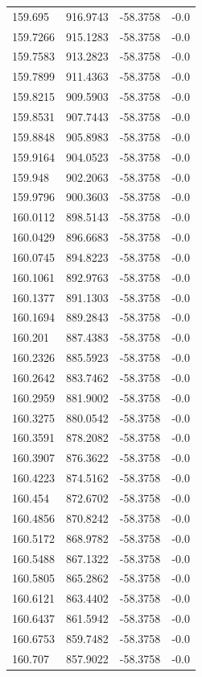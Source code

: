 \begin{table}[H]
\begin{tabular}{llll}
159.695 & 916.9743 & -58.3758 & -0.0 \\
159.7266 & 915.1283 & -58.3758 & -0.0 \\
159.7583 & 913.2823 & -58.3758 & -0.0 \\
159.7899 & 911.4363 & -58.3758 & -0.0 \\
159.8215 & 909.5903 & -58.3758 & -0.0 \\
159.8531 & 907.7443 & -58.3758 & -0.0 \\
159.8848 & 905.8983 & -58.3758 & -0.0 \\
159.9164 & 904.0523 & -58.3758 & -0.0 \\
159.948 & 902.2063 & -58.3758 & -0.0 \\
159.9796 & 900.3603 & -58.3758 & -0.0 \\
160.0112 & 898.5143 & -58.3758 & -0.0 \\
160.0429 & 896.6683 & -58.3758 & -0.0 \\
160.0745 & 894.8223 & -58.3758 & -0.0 \\
160.1061 & 892.9763 & -58.3758 & -0.0 \\
160.1377 & 891.1303 & -58.3758 & -0.0 \\
160.1694 & 889.2843 & -58.3758 & -0.0 \\
160.201 & 887.4383 & -58.3758 & -0.0 \\
160.2326 & 885.5923 & -58.3758 & -0.0 \\
160.2642 & 883.7462 & -58.3758 & -0.0 \\
160.2959 & 881.9002 & -58.3758 & -0.0 \\
160.3275 & 880.0542 & -58.3758 & -0.0 \\
160.3591 & 878.2082 & -58.3758 & -0.0 \\
160.3907 & 876.3622 & -58.3758 & -0.0 \\
160.4223 & 874.5162 & -58.3758 & -0.0 \\
160.454 & 872.6702 & -58.3758 & -0.0 \\
160.4856 & 870.8242 & -58.3758 & -0.0 \\
160.5172 & 868.9782 & -58.3758 & -0.0 \\
160.5488 & 867.1322 & -58.3758 & -0.0 \\
160.5805 & 865.2862 & -58.3758 & -0.0 \\
160.6121 & 863.4402 & -58.3758 & -0.0 \\
160.6437 & 861.5942 & -58.3758 & -0.0 \\
160.6753 & 859.7482 & -58.3758 & -0.0 \\
160.707 & 857.9022 & -58.3758 & -0.0 \\

\end{tabular}
\end{table}
